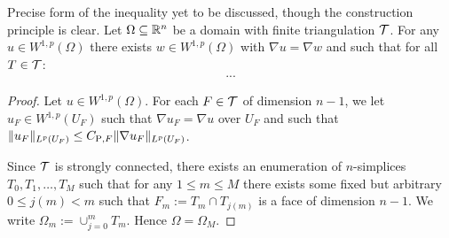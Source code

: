 \documentclass[a4paper]{amsart}
\begin{document}
\begin{theorem}\label{theorem:poincarefriedrichsestimate:grad}
    \color{red}Precise form of the inequality yet to be discussed, though the construction principle is clear.
    Let $\Omega \subseteq {\mathbb R}^{n}$ be a domain with finite triangulation ${\mathcal T}$.
    For any $u \in W^{1,p}(\Omega)$ there exists $w \in W^{1,p}(\Omega)$
    with $\nabla u = \nabla w$ and such that for all $T \in {\mathcal T}$:
    \begin{align*}
        ...
    \end{align*}
\end{theorem}

\begin{proof}
 Let $u \in W^{1,p}(\Omega)$. 
 For each $F \in {\mathcal T}$ of dimension $n-1$, 
 we let $u_F \in W^{1,p}(U_F)$ such that $\nabla u_F = \nabla u$ over $U_F$ and such that $\| u_F \|_{L^{p}(U_F)} \leq C_{{\rm{P}},F} \| \nabla u_F \|_{L^{p}(U_F)}$.
 
 Since ${\mathcal T}$ is strongly connected, there exists an enumeration of $n$-simplices $T_0, T_1, \dots, T_M$ such that for any $1 \leq m \leq M$ there exists some fixed but arbitrary $0 \leq j(m) < m$ such that $F_m := T_m \cap T_{j(m)}$ is a face of dimension $n-1$. We write $\Omega_m := \cup_{j=0}^{m} T_m$. Hence $\Omega = \Omega_M$. 
 
 
 

\end{proof}
\end{document}
